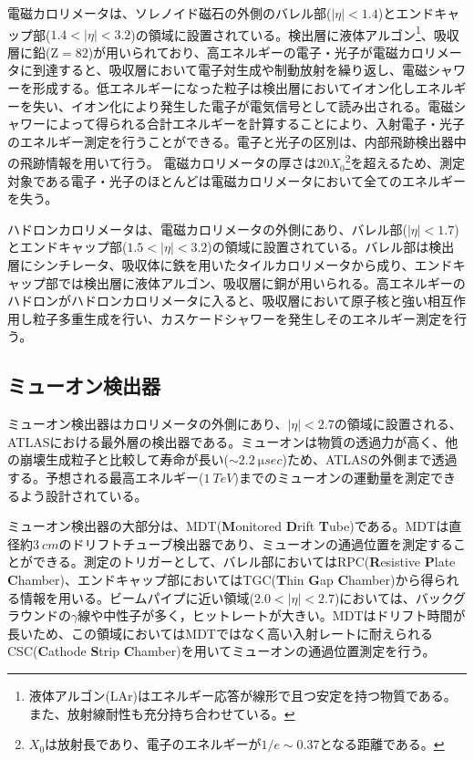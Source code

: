 電磁カロリメータは、ソレノイド磁石の外側のバレル部($|\eta|<1.4$)とエンドキャップ部($1.4<|\eta|<3.2$)の領域に設置されている。検出層に液体アルゴン\footnote{液体アルゴン(LAr)はエネルギー応答が線形で且つ安定を持つ物質である。また、放射線耐性も充分持ち合わせている。}、吸収層に鉛($\mathrm{Z}=82$)が用いられており、高エネルギーの電子・光子が電磁カロリメータに到達すると、吸収層において電子対生成や制動放射を繰り返し、電磁シャワーを形成する。低エネルギーになった粒子は検出層においてイオン化しエネルギーを失い、イオン化により発生した電子が電気信号として読み出される。電磁シャワーによって得られる合計エネルギーを計算することにより、入射電子・光子のエネルギー測定を行うことができる。電子と光子の区別は、内部飛跡検出器中の飛跡情報を用いて行う。
電磁カロリメータの厚さは$20X_0$\footnote{$X_0$は放射長であり、電子のエネルギーが$1/e\sim0.37$となる距離である。}を超えるため、測定対象である電子・光子のほとんどは電磁カロリメータにおいて全てのエネルギーを失う。

ハドロンカロリメータは、電磁カロリメータの外側にあり、バレル部($|\eta|<1.7$)とエンドキャップ部($1.5<|\eta|<3.2$)の領域に設置されている。バレル部は検出層にシンチレータ、吸収体に鉄を用いたタイルカロリメータから成り、エンドキャップ部では検出層に液体アルゴン、吸収層に銅が用いられる。高エネルギーのハドロンがハドロンカロリメータに入ると、吸収層において原子核と強い相互作用し粒子多重生成を行い、カスケードシャワーを発生しそのエネルギー測定を行う。



\subsection{ミューオン検出器}
\label{sec:mumu}
ミューオン検出器はカロリメータの外側にあり、$|\eta|<2.7$の領域に設置される、ATLASにおける最外層の検出器である。ミューオンは物質の透過力が高く、他の崩壊生成粒子と比較して寿命が長い($\sim 2.2\ \si{\micro sec}$)ため、ATLASの外側まで透過する。予想される最高エネルギー($1\ \si{TeV}$)までのミューオンの運動量を測定できるよう設計されている。

ミューオン検出器の大部分は、MDT(\textbf{M}onitored \textbf{D}rift \textbf{T}ube)である。MDTは直径約$3\ \si{cm}$のドリフトチューブ検出器であり、ミューオンの通過位置を測定することができる。測定のトリガーとして、バレル部においてはRPC(\textbf{R}esistive \textbf{P}late \textbf{C}hamber)、エンドキャップ部においてはTGC(\textbf{T}hin \textbf{G}ap \textbf{C}hamber)から得られる情報を用いる。ビームパイプに近い領域($2.0<|\eta|<2.7$)においては、バックグラウンドの$\gamma$線や中性子が多く，ヒットレートが大きい。MDTはドリフト時間が長いため、この領域においてはMDTではなく高い入射レートに耐えられるCSC(\textbf{C}athode \textbf{S}trip \textbf{C}hamber)を用いてミューオンの通過位置測定を行う。







